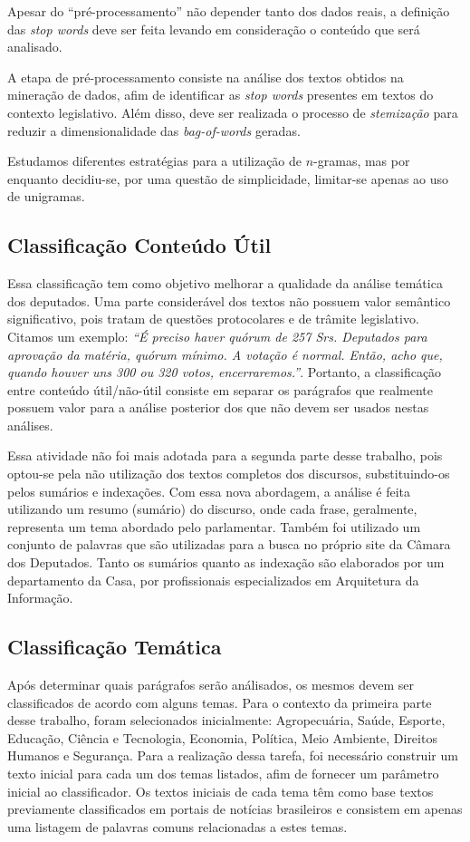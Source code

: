 Apesar do ``pré-processamento'' não depender tanto dos dados reais, a definição das \textit{stop words} deve ser feita levando em consideração o conteúdo que será analisado.

A etapa de pré-processamento consiste na análise dos textos obtidos na mineração de dados, afim de identificar as \textit{stop words} presentes em textos do contexto legislativo. Além disso, deve ser realizada o processo de \textit{stemização} para reduzir a dimensionalidade das \textit{bag-of-words} geradas.

Estudamos diferentes estratégias para a utilização de \(n\)-gramas, mas por enquanto decidiu-se, por uma questão de simplicidade, limitar-se apenas ao uso de unigramas.

\subsection{Classificação Conteúdo Útil}

Essa classificação tem como objetivo melhorar a qualidade da análise temática dos deputados. Uma parte considerável dos textos não possuem valor semântico significativo, pois tratam de questões protocolares e de trâmite legislativo. Citamos um exemplo: \textit{``É preciso haver quórum de 257 Srs. Deputados para aprovação da matéria, quórum mínimo. A votação é normal. Então, acho que, quando houver uns 300 ou 320 votos, encerraremos.''}. Portanto, a classificação entre conteúdo útil/não-útil consiste em separar os parágrafos que realmente possuem valor para a análise posterior dos que não devem ser usados nestas análises.

Essa atividade não foi mais adotada para a segunda parte desse trabalho, pois optou-se pela não utilização dos textos completos dos discursos, substituindo-os pelos sumários e indexações. Com essa nova abordagem, a análise é feita utilizando um resumo (sumário) do discurso, onde cada frase, geralmente, representa um tema abordado pelo parlamentar. Também foi utilizado um conjunto de palavras que são utilizadas para a busca no próprio site da Câmara dos Deputados. Tanto os sumários quanto as indexação são elaborados por um departamento da Casa, por profissionais especializados em Arquitetura da Informação.

\subsection{Classificação Temática}

Após determinar quais parágrafos serão análisados, os mesmos devem ser classificados de acordo com alguns temas. Para o contexto da primeira parte desse trabalho, foram selecionados inicialmente: Agropecuária, Saúde, Esporte, Educação, Ciência e Tecnologia, Economia, Política, Meio Ambiente, Direitos Humanos e Segurança. Para a realização dessa tarefa, foi necessário construir um texto inicial para cada um dos temas listados, afim de fornecer um parâmetro inicial ao classificador. Os textos iniciais de cada tema têm como base textos previamente classificados em portais de notícias brasileiros e consistem em apenas uma listagem de palavras comuns relacionadas a estes temas.

